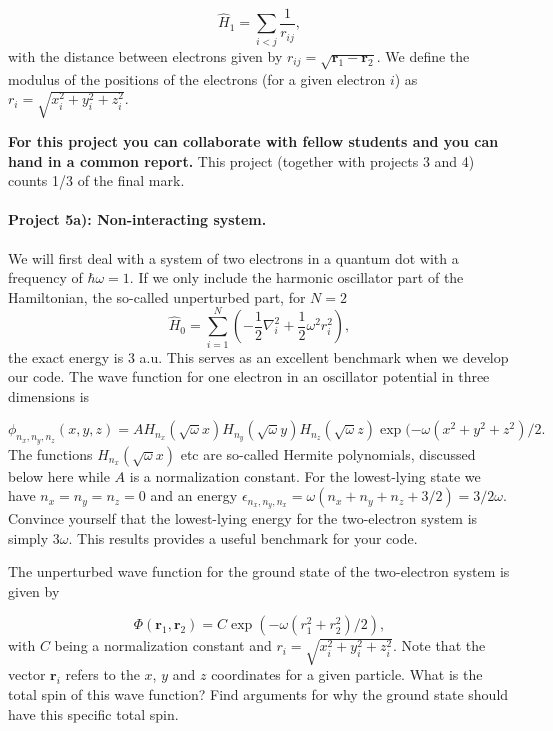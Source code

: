 \documentclass[%
oneside,                 %
final,                   %
10pt]{article}
\begin{document}
\begin{equation*}
\hat{H}_1=\sum_{i<j}\frac{1}{r_{ij}},
\end{equation*}
with the distance between electrons given by $r_{ij}=\sqrt{\mathbf{r}_1-\mathbf{r}_2}$. We define the
modulus of the positions of the electrons (for a given electron $i$) as $r_i = \sqrt{x_i^2+y_i^2+z_i^2}$.


\textbf{For this project you can collaborate with fellow students and you can  hand in a common report.}
This project (together with projects 3 and 4) counts 1/3 of the final mark.

\paragraph{Project 5a): Non-interacting system.}
We will first deal with a system of
  two electrons in a quantum dot with a frequency of $\hbar\omega = 1$.
  If we only include  the harmonic oscillator part of the Hamiltonian,
  the so-called unperturbed part,  for $N=2$
\begin{equation*} \hat{H}_0=\sum_{i=1}^{N} \left(  -\frac{1}{2} \nabla_i^2 + \frac{1}{2} \omega^2r_i^2  \right),\end{equation*}
  the exact energy is $3$ a.u.  This serves as an excellent benchmark when we develop our code.
  The wave function for one electron in an oscillator potential in three dimensions is

\begin{equation*}
  \phi_{n_x,n_y,n_z}(x,y,z) = A H_{n_x}(\sqrt{\omega}x)H_{n_y}(\sqrt{\omega}y)H_{n_z}(\sqrt{\omega}z)\exp{(-\omega(x^2+y^2+z^2)/2}.
  \end{equation*}
  The functions $H_{n_x}(\sqrt{\omega}x)$ etc are so-called Hermite polynomials, discussed below  here while $A$ is a normalization constant.
  For the lowest-lying state we have $n_x=n_y=n_z=0$ and an energy $\epsilon_{n_x,n_y,n_x}=\omega(n_x+n_y+n_z+3/2) = 3/2\omega$.
  Convince yourself that the lowest-lying energy for the two-electron system  is simply $3\omega$. This results provides a useful benchmark for your code.

  The unperturbed wave function for the ground state of the two-electron system is given by

\begin{equation*}
  \Phi(\mathbf{r}_1,\mathbf{r}_2) = C\exp{\left(-\omega(r_1^2+r_2^2)/2\right)},
  \end{equation*}
  with $C$ being a normalization constant and $r_i = \sqrt{x_i^2+y_i^2+z_i^2}$. Note that the vector $\mathbf{r}_i$
  refers to the $x$, $y$ and $z$ coordinates for a given particle.
  What is the total spin of this wave function? Find arguments for why the ground state should have
  this specific total spin.
\end{document}
